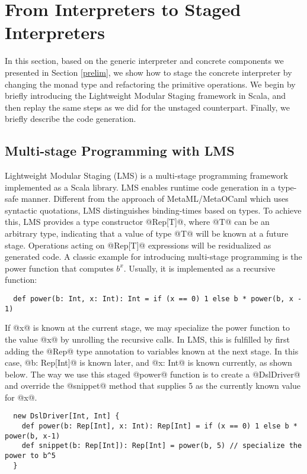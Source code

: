 \section{From Interpreters to Staged Interpreters} \label{stagedinterp}

In this section, based on the generic interpreter and concrete components we
presented in Section \ref{prelim}, we show how to stage the concrete
interpreter by changing the monad type and refactoring the primitive
operations. We begin by briefly introducing the Lightweight Modular Staging
framework in Scala, and then replay the same steps as we did for the unstaged
counterpart. Finally, we briefly describe the code generation.

\subsection{Multi-stage Programming with LMS}

Lightweight Modular Staging (LMS) \cite{DBLP:conf/gpce/RompfO10} is a
multi-stage programming framework implemented as a Scala library. LMS enables
runtime code generation in a type-safe manner. Different from the approach of
MetaML/MetaOCaml \cite{DBLP:conf/flops/Kiselyov14, DBLP:conf/gpce/CalcagnoTHL03} which
uses syntactic quotations, LMS distinguishes binding-times based on types. 
To achieve this, LMS provides a type constructor @Rep[T]@, where @T@ can be an
arbitrary type, indicating that a value of type @T@ will be known at a future
stage.  Operations acting on @Rep[T]@ expressions will be residualized as
generated code.
A classic example for introducing multi-stage programming is the power function
that computes $b^x$. Usually, it is implemented as a recursive function:
\begin{lstlisting}
  def power(b: Int, x: Int): Int = if (x == 0) 1 else b * power(b, x - 1)
\end{lstlisting}

If @x@ is known at the current stage, we may specialize the power function to
the value @x@ by unrolling the recursive calls. In LMS, this is fulfilled by
first adding the @Rep@ type annotation to variables known at the next stage. In this case,
@b: Rep[Int]@ is known later, and @x: Int@ is known currently, as shown below.
The way we use this staged @power@ function is to create a @DslDriver@ and override the
@snippet@ method that supplies 5 as the currently known value for @x@.
\begin{lstlisting}
  new DslDriver[Int, Int] {
    def power(b: Rep[Int], x: Int): Rep[Int] = if (x == 0) 1 else b * power(b, x-1)
    def snippet(b: Rep[Int]): Rep[Int] = power(b, 5) // specialize the power to b^5
  }
\end{lstlisting}

